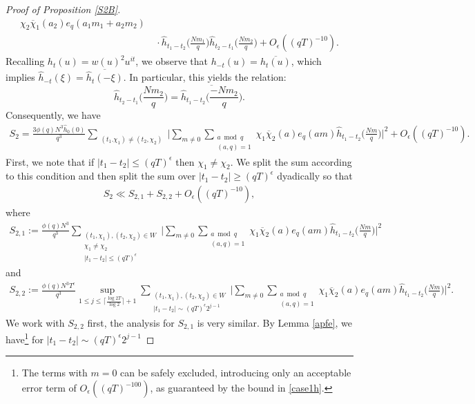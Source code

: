 \documentclass[12pt]{amsart}
\theoremstyle{definition}
\theoremstyle{plain}
\theoremstyle{remark}
\numberwithin{equation}{section}
\numberwithin{theorem}{section}
\numberwithin{equation}{section}
\begin{document}
\begin{proof}[Proof of Proposition \ref{S2B}]
\begin{align*}
			\chi_{2}\overline{\chi}_{1}(a_{2})
			e_q(a_1m_1+a_2m_2)
			\\
			&\ \cdot\hat{h}_{t_{1}-t_{2}}\bigg(\frac{Nm_{1}}{q}\bigg)\hat{h}_{t_{2}-t_{1}}\bigg(\frac{Nm_{2}}{q}\bigg)+O_{\epsilon}((qT)^{-10}).
		\end{align*}
		Recalling $h_{t}(u)=w(u)^{2}u^{it}$, we observe that $h_{-t}(u)=\overline{h_{t}(u)}$, which implies $\hat{h}_{-t}(\xi)=\overline{\hat{h}_{t}(-\xi)}$. In particular, this yields the relation: 
		\[\hat{h}_{t_{2}-t_{1}}\bigg(\frac{Nm_{2}}{q}\bigg)=\overline{\hat{h}_{t_{1}-t_{2}}\bigg(\frac{-Nm_{2}}{q}\bigg)}.\]
		Consequently, we have
		\begin{align*}
			S_{2}=\frac{3\phi(q)N^{3}\hat{h}_{0}(0)}{q^{3}}\sum_{\substack{(t_1.\chi_1)\neq (t_2,\chi_2)}}\bigg|\sum_{m\neq 0}\sum_{\substack{a \bmod q \\ (a, q)=1}}\chi_{1}
			\overline{\chi}_{2}(a)
			e_q(am)
			\hat{h}_{t_{1}-t_{2}}\bigg(\frac{Nm}{q}\bigg)\bigg|^{2}+O_{\epsilon}((qT)^{-10}).
		\end{align*}
		First, we note that if $|t_1-t_2| \leq (qT)^{\epsilon}$ then $\chi_1\neq \chi_2$. We split the sum according to this condition and then split the sum over $|t_1-t_2| \geq (qT)^{\epsilon}$ dyadically so that
		\begin{align*}
			S_2 \ll S_{2,1}+S_{2,2} + O_{\epsilon}((qT)^{-10}),
		\end{align*}
		where 
		\begin{align*}
			S_{2,1}:=\frac{\phi(q)N^{3}}{q^{3}}\sum_{\substack{(t_1,\chi_1),(t_2,\chi_2) \in W \\ \chi_{1}\neq \chi_{2}\\|t_{1}-t_{2}|\leq (qT)^{\epsilon} }}\bigg|\sum_{m\neq 0}\sum_{\substack{a \bmod q\\ (a, q)=1}}\chi_{1}
			\overline{\chi}_{2}(a)
			e_q(am)
			\hat{h}_{t_{1}-t_{2}}\bigg(\frac{Nm}{q}\bigg)\bigg|^{2}
		\end{align*}
		and 
		\begin{align*}
			S_{2,2}:=\frac{\phi(q)N^{3}T^{\epsilon}}{q^{3}}\sup_{1\leq j \leq \lceil\frac{\log 2T}{\log 2}\rceil+1 }\sum_{\substack{(t_1,\chi_1), (t_2,\chi_2) \in W \\|t_{1}-t_{2}|\sim (qT)^{\epsilon}2^{j-1} }}\bigg|\sum_{m\neq 0}\sum_{\substack{a \bmod q \\ (a, q)=1}}\chi_{1}
			\overline{\chi}_{2}(a)
			e_q(am)
			\hat{h}_{t_{1}-t_{2}}\bigg(\frac{Nm}{q}\bigg)\bigg|^{2}.
		\end{align*}
		We work with $S_{2,2}$ first, the analysis for $S_{2,1}$ is very similar. By Lemma \ref{apfe}, we have\footnote{The terms with $m=0$ can be safely excluded, introducing only an acceptable error term of $O_{\epsilon}((qT)^{-100})$, as guaranteed by the bound in \eqref{case1h}.} for $|t_{1}-t_{2}|\sim (qT)^{\epsilon}2^{j-1}$

\end{proof}
\end{document}
